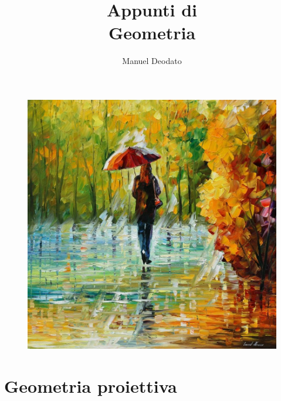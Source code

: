 \documentclass[11pt, a4paper]{scrartcl}
\title{Appunti di\\ \vspace{.1cm} Geometria}
\author{Manuel Deodato}
\date{}
\theoremstyle{style1}
\renewcommand{\maketitle}{
\begin{center}
{\sffamily
{\fontsize{20}{20}\selectfont\MakeUppercase\thetitle}}

\vspace{0.2in}

{\large\scshape\sffamily\theauthor}
\end{center}
}
\numberwithin{equation}{subsection}
\begin{document}
\maketitle
\vspace{9cm}
\begin{figure}[h!]
	\centering
	\includegraphics[width=.7\columnwidth]{front1.jpeg}
\end{figure}

\newpage
\tableofcontents 
\newpage
\section{Geometria proiettiva}
\end{document}
